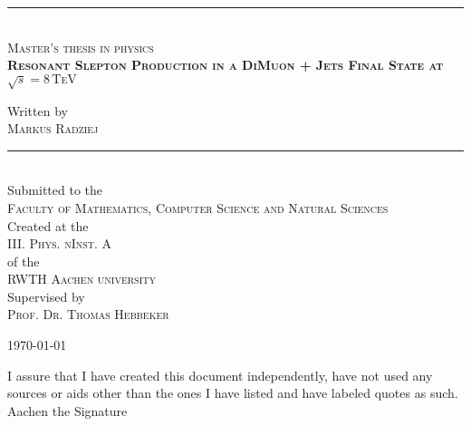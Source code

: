 \documentclass[11pt,a4paper,twoside,openright,DIV=13,BCOR=1cm]{scrbook} %
\numberwithin{equation}{chapter} %
\numberwithin{figure}{chapter} %
\numberwithin{table}{chapter} %
\begin{document}
\pagestyle{empty}

\begin{titlepage}
  \begin{center}
    \vspace{3.0cm}
    
    \rule{\linewidth}{0.5pt} \\
    \textsc{Master's thesis in physics} \\[0.4cm]
    
    \doublespacing
    \textsc{\LARGE \textbf{Resonant Slepton Production in a DiMuon + Jets Final State at $\sqrt{s} = 8\,\text{TeV}$}}\\[1.5cm]
    \singlespacing
    
    Written by\\[0.2cm]
    \textsc{Markus Radziej}\\
    
    
    \rule{\linewidth}{0.5pt} \\[3cm]
    
    
    
    Submitted to the\\
    \textsc{\large Faculty of Mathematics, Computer Science and Natural Sciences}\\[1.5cm]
    Created at the\\
    \textsc{\large III. Phys. nInst. A} \\[0.2cm]
    of the\\
    \textsc{\large RWTH Aachen university} \\[0.5cm]
    
    Supervised by\\
    \textsc{Prof. Dr. Thomas Hebbeker}
    
    \vfill
    {\large \today}
    
  \end{center}
\end{titlepage}

\clearpage{\pagestyle{empty}\cleardoublepage} %


\newpage
\noindent I assure that I have created this document independently, have not used any sources or aids other than the ones I have listed and have labeled quotes as such.\\[1.0cm]
\noindent Aachen the \hfill Signature
\end{document}
